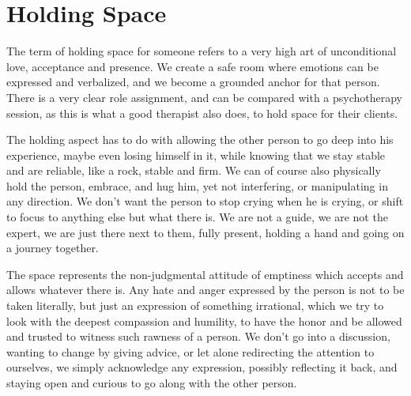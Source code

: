 

\section{Holding Space}\label{sec:holding-space}


The term of holding space for someone refers to a very high art of unconditional love, acceptance and presence.
We create a safe room where emotions can be expressed and verbalized, and we become a grounded anchor for that person.
There is a very clear role assignment, and can be compared with a psychotherapy session, as this is what a good therapist also does, to hold space for their clients.

The holding aspect has to do with allowing the other person to go deep into his experience, maybe even losing himself in it, while knowing that we stay stable and are reliable, like a rock, stable and firm.
We can of course also physically hold the person, embrace, and hug him, yet not interfering, or manipulating in any direction.
We don't want the person to stop crying when he is crying, or shift to focus to anything else but what there is.
We are not a guide, we are not the expert, we are just there next to them, fully present, holding a hand and going on a journey together.

The space represents the non-judgmental attitude of emptiness which accepts and allows whatever there is.
Any hate and anger expressed by the person is not to be taken literally, but just an expression of something irrational, which we try to look with the deepest compassion and humility, to have the honor and be allowed and trusted to witness such rawness of a person.
We don't go into a discussion, wanting to change by giving advice, or let alone redirecting the attention to ourselves, we simply acknowledge any expression, possibly reflecting it back, and staying open and curious to go along with the other person.

